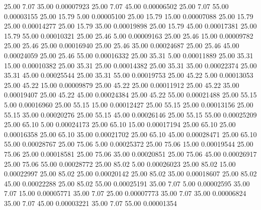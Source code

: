      25.00      7.07     35.00     0.00007923
     25.00      7.07     45.00     0.00006502
     25.00      7.07     55.00     0.00003155
     25.00     15.79      5.00     0.00005100
     25.00     15.79     15.00     0.00007088
     25.00     15.79     25.00     0.00014277
     25.00     15.79     35.00     0.00019898
     25.00     15.79     45.00     0.00017381
     25.00     15.79     55.00     0.00010321
     25.00     25.46      5.00     0.00009163
     25.00     25.46     15.00     0.00009782
     25.00     25.46     25.00     0.00016940
     25.00     25.46     35.00     0.00024687
     25.00     25.46     45.00     0.00024059
     25.00     25.46     55.00     0.00016332
     25.00     35.31      5.00     0.00011889
     25.00     35.31     15.00     0.00010382
     25.00     35.31     25.00     0.00014382
     25.00     35.31     35.00     0.00022374
     25.00     35.31     45.00     0.00025544
     25.00     35.31     55.00     0.00019753
     25.00     45.22      5.00     0.00013053
     25.00     45.22     15.00     0.00009879
     25.00     45.22     25.00     0.00011912
     25.00     45.22     35.00     0.00019407
     25.00     45.22     45.00     0.00024384
     25.00     45.22     55.00     0.00021488
     25.00     55.15      5.00     0.00016960
     25.00     55.15     15.00     0.00012427
     25.00     55.15     25.00     0.00013156
     25.00     55.15     35.00     0.00020276
     25.00     55.15     45.00     0.00026146
     25.00     55.15     55.00     0.00025209
     25.00     65.10      5.00     0.00024173
     25.00     65.10     15.00     0.00017194
     25.00     65.10     25.00     0.00016358
     25.00     65.10     35.00     0.00021702
     25.00     65.10     45.00     0.00028471
     25.00     65.10     55.00     0.00028767
     25.00     75.06      5.00     0.00025372
     25.00     75.06     15.00     0.00019544
     25.00     75.06     25.00     0.00018581
     25.00     75.06     35.00     0.00020851
     25.00     75.06     45.00     0.00026917
     25.00     75.06     55.00     0.00028772
     25.00     85.02      5.00     0.00026023
     25.00     85.02     15.00     0.00022997
     25.00     85.02     25.00     0.00020142
     25.00     85.02     35.00     0.00018607
     25.00     85.02     45.00     0.00022288
     25.00     85.02     55.00     0.00025191
     35.00      7.07      5.00     0.00002595
     35.00      7.07     15.00     0.00005771
     35.00      7.07     25.00     0.00007773
     35.00      7.07     35.00     0.00006824
     35.00      7.07     45.00     0.00003221
     35.00      7.07     55.00     0.00001354
